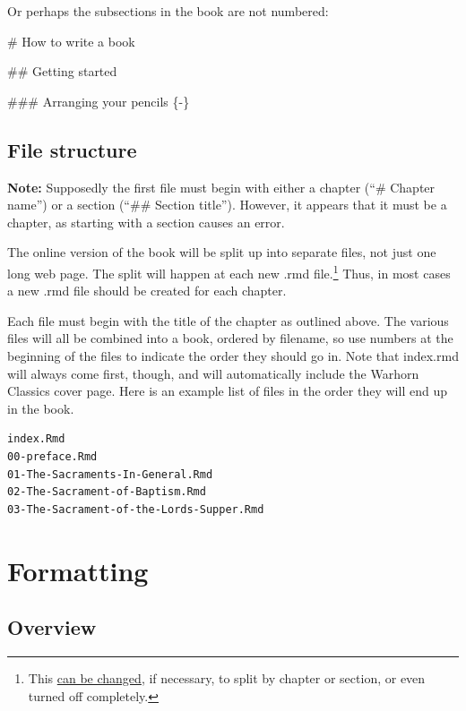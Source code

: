 \documentclass[
]{book}
\newenvironment{Shaded}{\begin{snugshade}}{\end{snugshade}}
\newcommand{\FunctionTok}[1]{\textcolor[rgb]{0.00,0.00,0.00}{#1}}
\begin{document}
Or perhaps the subsections in the book are not numbered:

\begin{Shaded}
\begin{Highlighting}[]
\FunctionTok{\# How to write a book}

\FunctionTok{\#\# Getting started}

\FunctionTok{\#\#\# Arranging your pencils \{{-}\}}
\end{Highlighting}
\end{Shaded}

\hypertarget{file-structure}{%
\subsection{File structure}\label{file-structure}}

\textbf{Note:} Supposedly the first file must begin with either a chapter (``\# Chapter name'') or a section (``\#\# Section title''). However, it appears that it must be a chapter, as starting with a section causes an error.

The online version of the book will be split up into separate files, not just one long web page. The split will happen at each new .rmd file.\footnote{This \href{https://bookdown.org/yihui/bookdown/html.html\#gitbook-style}{can be changed}, if necessary, to split by chapter or section, or even turned off completely.} Thus, in most cases a new .rmd file should be created for each chapter.

Each file must begin with the title of the chapter as outlined above. The various files will all be combined into a book, ordered by filename, so use numbers at the beginning of the files to indicate the order they should go in. Note that index.rmd will always come first, though, and will automatically include the Warhorn Classics cover page. Here is an example list of files in the order they will end up in the book.

\begin{verbatim}
index.Rmd
00-preface.Rmd
01-The-Sacraments-In-General.Rmd
02-The-Sacrament-of-Baptism.Rmd
03-The-Sacrament-of-the-Lords-Supper.Rmd
\end{verbatim}

\hypertarget{formatting}{%
\section{Formatting}\label{formatting}}

\hypertarget{overview}{%
\subsection{Overview}\label{overview}}
\end{document}

